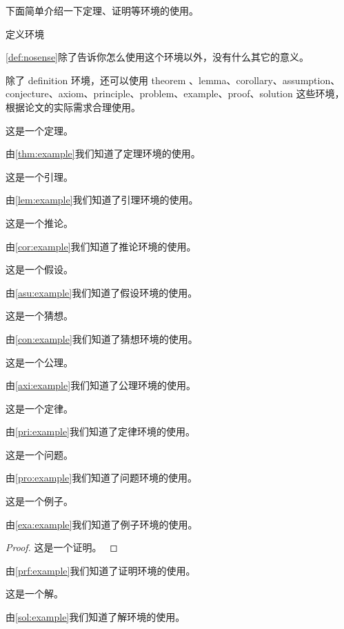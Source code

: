 下面简单介绍一下定理、证明等环境的使用。
\begin{definition}
    定义环境
    \label{def:nosense}
\end{definition}
\cref{def:nosense}除了告诉你怎么使用这个环境以外，没有什么其它的意义。

除了 definition 环境，还可以使用 theorem 、lemma、corollary、assumption、conjecture、axiom、principle、problem、example、proof、solution 这些环境，根据论文的实际需求合理使用。

\begin{theorem}
    这是一个定理。
    \label{thm:example}
\end{theorem}
由\cref{thm:example}我们知道了定理环境的使用。

\begin{lemma}
    这是一个引理。
    \label{lem:example}
\end{lemma}
由\cref{lem:example}我们知道了引理环境的使用。

\begin{corollary}
    这是一个推论。
    \label{cor:example}
\end{corollary}
由\cref{cor:example}我们知道了推论环境的使用。

\begin{assumption}
    这是一个假设。
    \label{asu:example}
\end{assumption}
由\cref{asu:example}我们知道了假设环境的使用。

\begin{conjecture}
    这是一个猜想。
    \label{con:example}
\end{conjecture}
由\cref{con:example}我们知道了猜想环境的使用。

\begin{axiom}
    这是一个公理。
    \label{axi:example}
\end{axiom}
由\cref{axi:example}我们知道了公理环境的使用。

\begin{principle}
    这是一个定律。
    \label{pri:example}
\end{principle}
由\cref{pri:example}我们知道了定律环境的使用。

\begin{problem}
    这是一个问题。
    \label{pro:example}
\end{problem}
由\cref{pro:example}我们知道了问题环境的使用。

\begin{example}
    这是一个例子。
    \label{exa:example}
\end{example}
由\cref{exa:example}我们知道了例子环境的使用。

\begin{proof}
    这是一个证明。
    \label{prf:example}
\end{proof}
由\cref{prf:example}我们知道了证明环境的使用。

\begin{solution}
    这是一个解。
    \label{sol:example}
\end{solution}
由\cref{sol:example}我们知道了解环境的使用。
